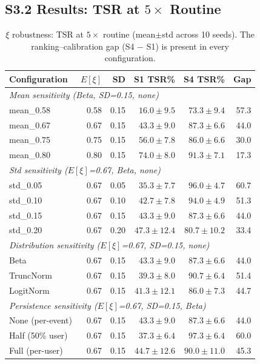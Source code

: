 \subsection*{S3.2 Results: TSR at $5\times$ Routine}

\begin{table}[h!]
\centering
\caption{$\xi$ robustness: TSR at $5\times$ routine (mean$\pm$std
across 10 seeds). The ranking--calibration gap (S4 $-$ S1)
is present in every configuration.}
\label{tab:xi_robust}
\begin{tabular}{lrrrrr}
\toprule
\textbf{Configuration} & $E[\xi]$ & SD & \textbf{S1 TSR\%} & \textbf{S4 TSR\%} & \textbf{Gap} \\
\midrule
\multicolumn{6}{l}{\textit{Mean sensitivity (Beta, SD=0.15, none)}} \\
\midrule
mean\_0.58 & 0.58 & 0.15 & $16.0 \pm 9.5$ & $73.3 \pm 9.4$ & 57.3 \\
mean\_0.67 & 0.67 & 0.15 & $43.3 \pm 9.0$ & $87.3 \pm 6.6$ & 44.0 \\
mean\_0.75 & 0.75 & 0.15 & $56.0 \pm 7.8$ & $86.0 \pm 6.6$ & 30.0 \\
mean\_0.80 & 0.80 & 0.15 & $74.0 \pm 8.0$ & $91.3 \pm 7.1$ & 17.3 \\
\midrule
\multicolumn{6}{l}{\textit{Std sensitivity ($E[\xi]$=0.67, Beta, none)}} \\
\midrule
std\_0.05 & 0.67 & 0.05 & $35.3 \pm 7.7$ & $96.0 \pm 4.7$ & 60.7 \\
std\_0.10 & 0.67 & 0.10 & $42.7 \pm 7.8$ & $94.0 \pm 4.9$ & 51.3 \\
std\_0.15 & 0.67 & 0.15 & $43.3 \pm 9.0$ & $87.3 \pm 6.6$ & 44.0 \\
std\_0.20 & 0.67 & 0.20 & $47.3 \pm 12.4$ & $80.7 \pm 10.2$ & 33.4 \\
\midrule
\multicolumn{6}{l}{\textit{Distribution sensitivity ($E[\xi]$=0.67, SD=0.15, none)}} \\
\midrule
Beta & 0.67 & 0.15 & $43.3 \pm 9.0$ & $87.3 \pm 6.6$ & 44.0 \\
TruncNorm & 0.67 & 0.15 & $39.3 \pm 8.0$ & $90.7 \pm 6.4$ & 51.4 \\
LogitNorm & 0.67 & 0.15 & $41.3 \pm 12.1$ & $86.0 \pm 7.3$ & 44.7 \\
\midrule
\multicolumn{6}{l}{\textit{Persistence sensitivity ($E[\xi]$=0.67, SD=0.15, Beta)}} \\
\midrule
None (per-event) & 0.67 & 0.15 & $43.3 \pm 9.0$ & $87.3 \pm 6.6$ & 44.0 \\
Half (50\% user) & 0.67 & 0.15 & $37.3 \pm 6.4$ & $97.3 \pm 6.4$ & 60.0 \\
Full (per-user) & 0.67 & 0.15 & $44.7 \pm 12.6$ & $90.0 \pm 11.0$ & 45.3 \\
\bottomrule
\end{tabular}
\end{table}

